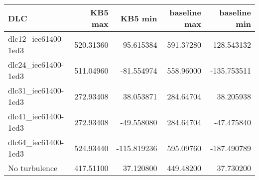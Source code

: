\begin{tabular}{lrrrr}
\toprule
                 DLC &     KB5 max &      KB5 min &  baseline max &  baseline min \\
\midrule
 dlc12\_iec61400-1ed3 &  520.31360 &  -95.615384 &     591.37280 &   -128.543132 \\
 dlc24\_iec61400-1ed3 &  511.04960 &  -81.554974 &     558.96000 &   -135.753511 \\
 dlc31\_iec61400-1ed3 &  272.93408 &   38.053871 &     284.64704 &     38.205938 \\
 dlc41\_iec61400-1ed3 &  272.93408 &  -49.558080 &     284.64704 &    -47.475840 \\
 dlc64\_iec61400-1ed3 &  524.93440 & -115.819236 &     595.09760 &   -187.490789 \\
        No turbulence &  417.51100 &   37.120800 &     449.48200 &     37.730200 \\
\bottomrule
\end{tabular}


